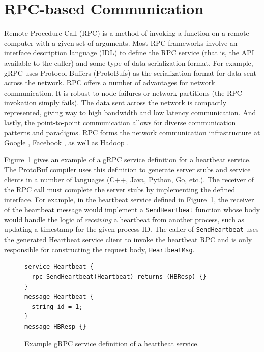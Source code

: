 \documentclass[conference]{IEEEtran}
\begin{document}
\section{RPC-based Communication}
Remote Procedure Call (RPC) is a method of invoking a function on a remote
computer with a given set of arguments. Most RPC frameworks involve an interface
description language (IDL)
to define the RPC service (that is, the API available to the caller) and some
type of data serialization format. For example, gRPC uses Protocol Buffers (ProtoBufs)
\cite{Varda2008} as the serialization format for data sent across the network.
RPC offers a number of advantages for network communication. It is robust to
node failures or network partitions (the RPC invokation simply fails). The data
sent across the network is compactly represented, giving way to high bandwidth
and low latency communication. And lastly, the point-to-point communication allows for
diverse communication patterns and paradigms. RPC forms the network communication
infrastructure at Google \cite{van2017production}, Facebook \cite{Slee2007},
as well as Hadoop
\cite{Shvachko:2010:HDF:1913798.1914427, Lu:2013:HDH:2570457.2571128}.

Figure~\ref{fig:heartbeat} gives an example of a gRPC service
definition for a heartbeat service. The ProtoBuf compiler uses this definition
to generate server stubs and service clients in a number of languages (C++,
Java, Python, Go, etc.). The receiver of the RPC call must complete the server
stubs by implementing the defined interface. For example, in the heartbeat
service defined in Figure~\ref{fig:heartbeat}, the receiver of the heartbeat
message would implement a \texttt{SendHeartbeat} function whose body would
handle the logic of \emph{receiving} a heartbeat from another process,
such as updating a timestamp for the given process ID. The caller of
\texttt{SendHeartbeat} uses the generated Heartbeat service client to invoke
the heartbeat RPC and is only
responsible for constructing the request body, \texttt{HeartbeatMsg}.

\begin{figure}
  \begin{lstlisting}
service Heartbeat {
  rpc SendHeartbeat(Heartbeat) returns (HBResp) {}
}
message Heartbeat {
  string id = 1;
}
message HBResp {}
\end{lstlisting}
\caption{Example gRPC service definition of a heartbeat service.}
\label{fig:heartbeat}
\end{figure}
\end{document}
